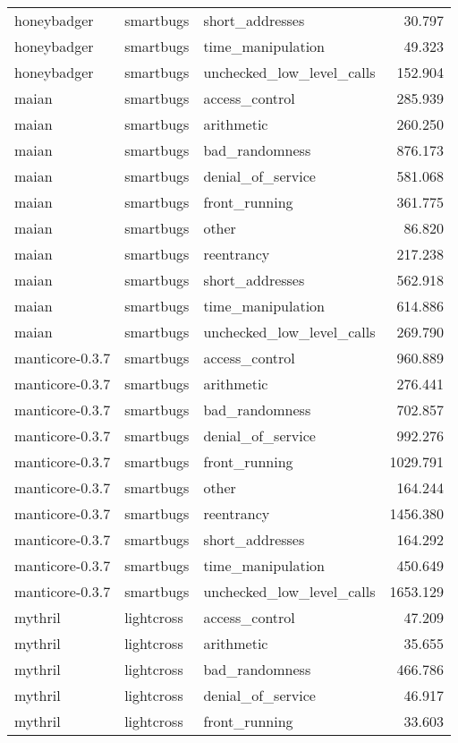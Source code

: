 \begin{tabular}[t]{lllr}
honeybadger & smartbugs & short\_addresses & 30.797\\
honeybadger & smartbugs & time\_manipulation & 49.323\\
honeybadger & smartbugs & unchecked\_low\_level\_calls & 152.904\\
\addlinespace
maian & smartbugs & access\_control & 285.939\\
maian & smartbugs & arithmetic & 260.250\\
maian & smartbugs & bad\_randomness & 876.173\\
maian & smartbugs & denial\_of\_service & 581.068\\
maian & smartbugs & front\_running & 361.775\\
\addlinespace
maian & smartbugs & other & 86.820\\
maian & smartbugs & reentrancy & 217.238\\
maian & smartbugs & short\_addresses & 562.918\\
maian & smartbugs & time\_manipulation & 614.886\\
maian & smartbugs & unchecked\_low\_level\_calls & 269.790\\
\addlinespace
manticore-0.3.7 & smartbugs & access\_control & 960.889\\
manticore-0.3.7 & smartbugs & arithmetic & 276.441\\
manticore-0.3.7 & smartbugs & bad\_randomness & 702.857\\
manticore-0.3.7 & smartbugs & denial\_of\_service & 992.276\\
manticore-0.3.7 & smartbugs & front\_running & 1029.791\\
\addlinespace
manticore-0.3.7 & smartbugs & other & 164.244\\
manticore-0.3.7 & smartbugs & reentrancy & 1456.380\\
manticore-0.3.7 & smartbugs & short\_addresses & 164.292\\
manticore-0.3.7 & smartbugs & time\_manipulation & 450.649\\
manticore-0.3.7 & smartbugs & unchecked\_low\_level\_calls & 1653.129\\
\addlinespace
mythril & lightcross & access\_control & 47.209\\
mythril & lightcross & arithmetic & 35.655\\
mythril & lightcross & bad\_randomness & 466.786\\
mythril & lightcross & denial\_of\_service & 46.917\\
mythril & lightcross & front\_running & 33.603\\

\end{tabular}
